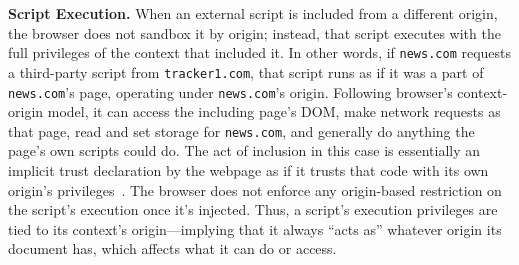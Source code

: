 \begin{comment}
%
However, for \texttt{XHR}/\texttt{fetch} and other cases where the script including the resource would directly consume the response, CORS prevents unauthorized sharing. 
%
%
%
This suggests that image resources can perform cross-origin tracking more easily than scripts.
%
CORS thus complements the SOP by opening safe channel for cross-site data access when needed, without collapsing the default restrictions.
\end{comment}


\noindent \textbf{Script Execution.} 
%
When an external script is included from a different origin, the browser does not sandbox it by origin; instead, that script executes with the full privileges of the context that included it. 
%
In other words, if \texttt{news.com} requests a third-party script from \texttt{tracker1.com}, that script runs as if it was a part of \texttt{news.com}’s page, operating under \texttt{news.com}’s origin. 
%
Following browser's context-origin model, it can access the including page’s DOM, make network requests as that page, read and set storage for \texttt{news.com}, and generally do anything the page’s own scripts could do. 
%
The act of inclusion in this case is essentially an implicit trust declaration by the webpage as if it trusts that code with its own origin’s privileges~\cite{WebKitTrackingPrevention}. 
%
The browser does not enforce any origin-based restriction on the script’s execution once it’s injected.
%
Thus, a script's execution privileges are tied to its context’s origin---implying that it always ``acts as'' whatever origin its document has, which affects what it can do or access.




